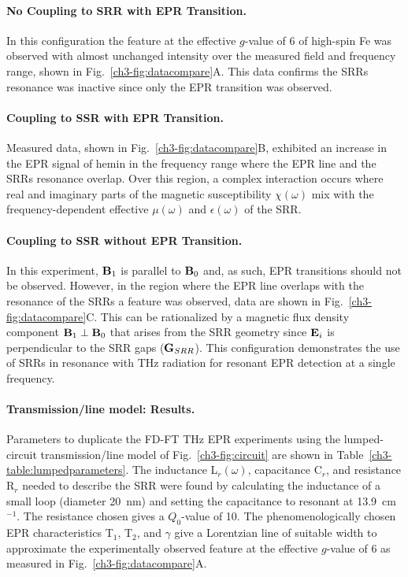 \noindent \paragraph*{No Coupling to SRR with EPR Transition.} In this configuration the feature at the effective $g$-value of 6 of high-spin Fe was observed with almost unchanged intensity over the measured field and frequency range, shown in Fig.~\ref{ch3-fig:datacompare}A. This data confirms the SRRs resonance was inactive since only the EPR transition was observed. 

\noindent \paragraph*{Coupling to SSR with EPR Transition.} Measured data, shown in Fig.~\ref{ch3-fig:datacompare}B, exhibited an increase in the EPR signal of hemin in the frequency range where the EPR line and the SRRs resonance overlap. Over this region, a complex interaction occurs where real and imaginary parts of the magnetic susceptibility $\chi(\omega)$ mix with the frequency-dependent effective $\mu(\omega)$ and $\epsilon(\omega)$ of the SRR.

\noindent \paragraph*{Coupling to SSR without EPR Transition.} In this experiment, $\textbf{B}_{1}$ is parallel to $\textbf{B}_{0}$ and, as such, EPR transitions should not be observed. However, in the region where the EPR line overlaps with the resonance of the SRRs a feature was observed, data are shown in Fig.~\ref{ch3-fig:datacompare}C. This can be rationalized by a magnetic flux density component $\textbf{B}_{1}\perp\textbf{B}_{0}$ that arises from the SRR geometry since $\textbf{E}_{i}$ is perpendicular to the SRR gaps ($\textbf{G}_{SRR}$). This configuration demonstrates the use of SRRs in resonance with THz radiation for resonant EPR detection at a single frequency. 

\noindent \paragraph*{Transmission\-/line model: Results.} Parameters to duplicate the FD-FT THz EPR experiments using the lumped-circuit transmission\-/line model of Fig.~\ref{ch3-fig:circuit} are shown in Table~\ref{ch3-table:lumpedparameters}. The inductance L$_r(\omega)$, capacitance C$_r$, and resistance R$_r$ needed to describe the SRR were found by calculating the inductance of a small loop (diameter 20~nm) and setting the capacitance to resonant at 13.9~cm$^{-1}$. The resistance chosen gives a $Q_0$-value of 10. The phenomenologically chosen EPR characteristics T$_1$, T$_2$, and $\gamma$ give a Lorentzian line of suitable width to approximate the experimentally observed feature at the effective $g$-value of 6 as measured in Fig.~\ref{ch3-fig:datacompare}A. 

